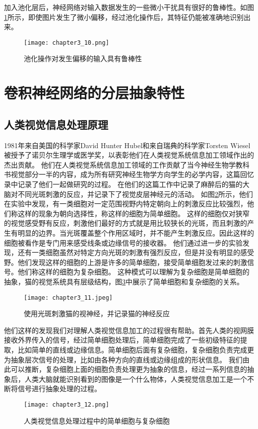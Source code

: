 加入池化层后，神经网络对输入数据发生的一些微小干扰具有很好的鲁棒性。如图\ref{fig:chapter3_10}所示，即使图片发生了微小偏移，经过池化操作后，其特征仍能被准确地识别出来。
\begin{figure}
    \centering
    \texttt{[image: chapter3\_10.png]}
    \caption{池化操作对发生偏移的输入具有鲁棒性\cite{luyujie_216}}
    \label{fig:chapter3_10}
\end{figure}

\section{卷积神经网络的分层抽象特性}
\subsection{人类视觉信息处理原理}
1981年来自美国的科学家David Hunter Hubel和来自瑞典的科学家Torsten Wiesel被授予了诺贝尔生理学或医学奖，以表彰他们在人类视觉系统信息加工领域作出的杰出贡献。
他们在人类视觉系统信息加工领域的工作贡献了当今神经生物学教科书视觉部分一半的内容，成为所有研究神经生物学方向学生的必学内容，这篇回忆录\cite{Hubel1998EarlyEO}中记录了他们一起做研究的过程。
在他们的这篇工作\cite{https://doi.org/10.1113/jphysiol.1959.sp006308}中记录了麻醉后的猫的大脑对不同光斑刺激的反应，并记录下了视觉皮层神经元的活动。
如图\ref{fig:chapter3_11}所示，他们在实验中发现，有一类细胞对一定范围视野内特定朝向上的刺激反应比较强烈，他们称这样的现象为朝向选择性，称这样的细胞为简单细胞。
这样的细胞仅对狭窄的视觉感受野有反应，刺激他们最好的方式就是用比较狭长的光斑，而且刺激的产生有明显的边界。当光斑覆盖整个作用区域时，并不能产生刺激反应。因此这样的细胞被看作是专门用来感受线条或边缘信号的接收器。
他们通过进一步的实验发现，还有一类细胞虽然对特定方向光斑的刺激有强烈反应，但是并没有明显的感受野。他们发现这样的细胞的上游是许多的简单细胞，接受简单细胞发过来的刺激信号。他们称这样的细胞为复杂细胞。
这种模式可以理解为复杂细胞是简单细胞的抽象，猫的视觉系统具有层级结构，图\ref{fig:chapter3_12}中展示了简单细胞和复杂细胞的关系。
\begin{figure}
    \centering
    \texttt{[image: chapter3\_11.jpeg]}
    \caption{使用光斑刺激猫的视神经，并记录猫的神经反应\cite{yanjianweishi}}
    \label{fig:chapter3_11}
\end{figure}

他们这样的发现我们对理解人类视觉信息加工的过程很有帮助。首先人类的视网膜接收外界传入的信号，经过简单细胞处理后，简单细胞完成了一些初级特征的提取，比如简单的直线或边缘信息。简单细胞后面有复杂细胞，复杂细胞负责完成更为抽象层次信号的处理，比如由各种方向的直线或边缘组成的形状信息。
我们由此可以推断，复杂细胞上面的细胞负责处理更为抽象的信息，经过一系列信息的抽象后，人类大脑就能识别看到的图像是一个什么物体，人类视觉信息加工是一个不断将信号进行抽象处理的过程。
\begin{figure}
    \centering
    \texttt{[image: chapter3\_12.png]}
    \caption{人类视觉信息处理过程中的简单细胞与复杂细胞\cite{yanjianweishi}}
    \label{fig:chapter3_12}
\end{figure}

